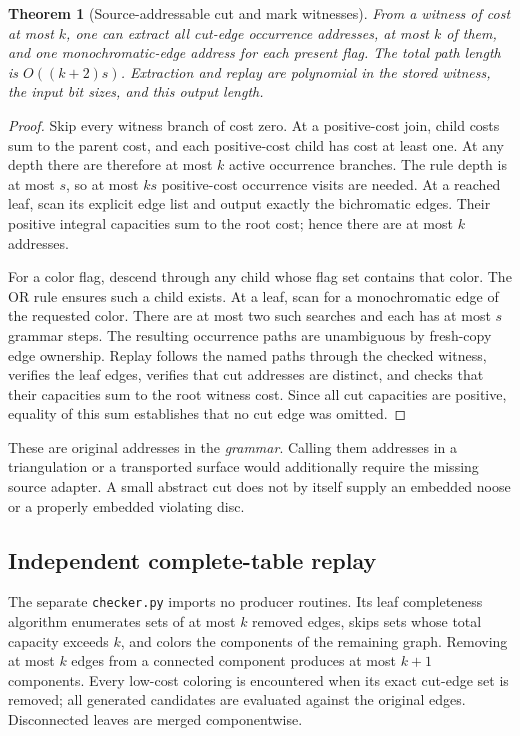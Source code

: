 \documentclass[11pt,a4paper]{article}
\newtheorem{theorem}{Theorem}[section]
\theoremstyle{definition}
\theoremstyle{remark}
\newcommand{\code}[1]{\nolinkurl{#1}}
\begin{document}
\begin{theorem}[Source-addressable cut and mark witnesses]
\label{thm:addresses}
From a witness of cost at most $k$, one can extract all cut-edge occurrence addresses, at most $k$ of them, and one monochromatic-edge address for each present flag. The total path length is $O((k+2)s)$. Extraction and replay are polynomial in the stored witness, the input bit sizes, and this output length.
\end{theorem}
\begin{proof}
Skip every witness branch of cost zero. At a positive-cost join, child costs sum to the parent cost, and each positive-cost child has cost at least one. At any depth there are therefore at most $k$ active occurrence branches. The rule depth is at most $s$, so at most $ks$ positive-cost occurrence visits are needed. At a reached leaf, scan its explicit edge list and output exactly the bichromatic edges. Their positive integral capacities sum to the root cost; hence there are at most $k$ addresses.

For a color flag, descend through any child whose flag set contains that color. The OR rule ensures such a child exists. At a leaf, scan for a monochromatic edge of the requested color. There are at most two such searches and each has at most $s$ grammar steps. The resulting occurrence paths are unambiguous by fresh-copy edge ownership. Replay follows the named paths through the checked witness, verifies the leaf edges, verifies that cut addresses are distinct, and checks that their capacities sum to the root witness cost. Since all cut capacities are positive, equality of this sum establishes that no cut edge was omitted.
\end{proof}
These are original addresses in the \emph{grammar}. Calling them addresses in a triangulation or a transported surface would additionally require the missing source adapter. A small abstract cut does not by itself supply an embedded noose or a properly embedded violating disc.

\subsection{Independent complete-table replay}
The separate \code{checker.py} imports no producer routines. Its leaf completeness algorithm enumerates sets of at most $k$ removed edges, skips sets whose total capacity exceeds $k$, and colors the components of the remaining graph. Removing at most $k$ edges from a connected component produces at most $k+1$ components. Every low-cost coloring is encountered when its exact cut-edge set is removed; all generated candidates are evaluated against the original edges. Disconnected leaves are merged componentwise.
\end{document}
